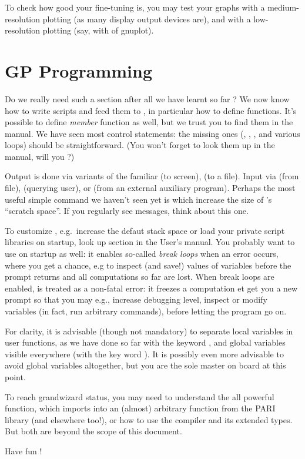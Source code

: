To check how good your fine-tuning is, you may test your graphs with a
medium-resolution plotting (as many display output devices are), and
with a low-resolution plotting (say, with  of gnuplot).

\section{GP Programming}

Do we really need such a section after all we have learnt so far ? We now
know how to write scripts and feed them to , in particular how to
define functions. It's possible to define \emph{member} function as well, but
we trust you to find them in the manual. We have seen most control
statements: the missing ones (, , ,
 and various  loops) should be straightforward. (You
won't forget to look them up in the manual, will you ?)

Output is done via variants of the familiar  (to screen),
 (to a file). Input via  (from file), 
(querying user), or  (from an external auxiliary program).
Perhaps the most useful simple command we haven't seen yet is
 which increase the size of 's ``scratch space''. If
you regularly see  messages, think about this
one.

To customize , e.g.~increase the defaut stack space or load your
private script libraries on startup, look up 
section in the User's manual. You probably want to use  on startup
as well: it enables so-called \emph{break loops} when an error occurs, where
you get a chance, e.g to inspect (and save!) values of variables before the
prompt returns and all computations so far are lost. When break loops
are enabled,  is treated as a non-fatal error: it freezes a
computation et get you a new prompt so that you may e.g., increase debugging
level, inspect or modify variables (in fact, run arbitrary commands), before
letting the program go on.

For clarity, it is advisable (though not mandatory) to separate local
variables in user functions, as we have done so far with the keyword
, and global variables visible everywhere (with the key word
). It is possibly even more advisable to avoid global variables
altogether, but you are the sole master on board at this point.



To reach grandwizard status, you may need to understand the all powerful
 function, which imports into  an (almost) arbitrary
function from the PARI library (and elsewhere too!), or how to use the
 compiler and its extended types. But both are beyond the scope of
this document.

Have fun !
\vfill\eject\bye
